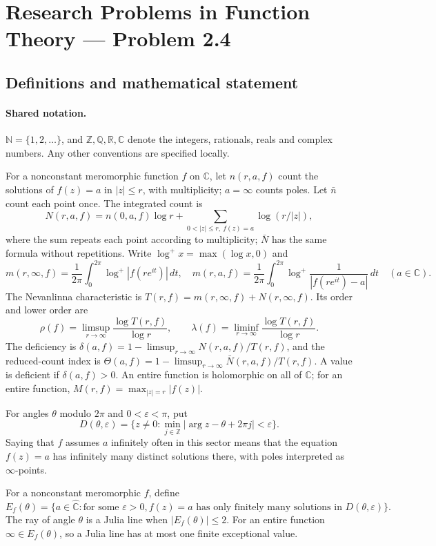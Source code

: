 \documentclass[11pt]{article}
\begin{document}
\section{Research Problems in Function Theory — Problem 2.4}\label{statement}

\subsection{Definitions and mathematical statement}

\paragraph{Shared notation.}$\mathbb N=\{1,2,\ldots\}$, and $\mathbb Z,\mathbb Q,\mathbb R,\mathbb C$ denote the integers, rationals, reals and complex numbers. Any other conventions are specified locally.


For a nonconstant meromorphic function $f$ on $\mathbb C$, let $n(r,a,f)$ count the solutions of $f(z)=a$ in $|z|\le r$, with multiplicity; $a=\infty$ counts poles. Let $\bar n$ count each point once. The integrated count is
\[
 N(r,a,f)=n(0,a,f)\log r+\sum_{0<|z|\le r,\ f(z)=a}\log(r/|z|),
\]
where the sum repeats each point according to multiplicity; $\bar N$ has the same formula without repetitions. Write $\log^+x=\max(\log x,0)$ and
\[
 m(r,\infty,f)=\frac1{2\pi}\int_0^{2\pi}\log^+|f(re^{it})|\,dt,\quad
 m(r,a,f)=\frac1{2\pi}\int_0^{2\pi}\log^+\frac1{|f(re^{it})-a|}\,dt\quad(a\in\mathbb C).
\]
The Nevanlinna characteristic is $T(r,f)=m(r,\infty,f)+N(r,\infty,f)$. Its order and lower order are
\[
 \rho(f)=\limsup_{r\to\infty}\frac{\log T(r,f)}{\log r},\qquad
 \lambda(f)=\liminf_{r\to\infty}\frac{\log T(r,f)}{\log r}.
\]
The deficiency is $\delta(a,f)=1-\limsup_{r\to\infty}N(r,a,f)/T(r,f)$, and the reduced-count index is $\Theta(a,f)=1-\limsup_{r\to\infty}\bar N(r,a,f)/T(r,f)$. A value is deficient if $\delta(a,f)>0$. An entire function is holomorphic on all of $\mathbb C$; for an entire function, $M(r,f)=\max_{|z|=r}|f(z)|$.

For angles $\theta$ modulo $2\pi$ and $0<\varepsilon<\pi$, put
\[
 D(\theta,\varepsilon)=\{z\ne0:\min_{j\in\mathbb Z}|\arg z-\theta+2\pi j|<\varepsilon\}.
\]
Saying that $f$ assumes $a$ infinitely often in this sector means that the equation $f(z)=a$ has infinitely many distinct solutions there, with poles interpreted as $\infty$-points.

For a nonconstant meromorphic $f$, define
\[
 E_f(\theta)=\{a\in\widehat{\mathbb C}:\text{for some }\varepsilon>0,
                  f(z)=a\text{ has only finitely many solutions in }D(\theta,\varepsilon)\}.
\]
The ray of angle $\theta$ is a Julia line when $|E_f(\theta)|\le2$. For an entire function $\infty\in E_f(\theta)$, so a Julia line has at most one finite exceptional value.
\end{document}
